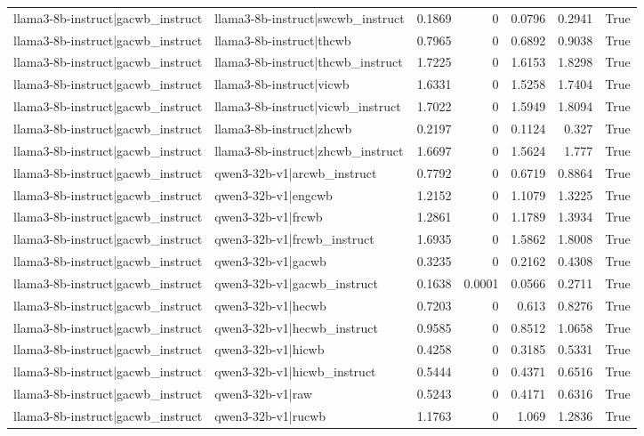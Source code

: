 \begin{table}
\begin{tabular}{l l r r r r l}
llama3-8b-instruct|gacwb_instruct & llama3-8b-instruct|swcwb_instruct & 0.1869 & 0 & 0.0796 & 0.2941 & True \\
llama3-8b-instruct|gacwb_instruct & llama3-8b-instruct|thcwb & 0.7965 & 0 & 0.6892 & 0.9038 & True \\
llama3-8b-instruct|gacwb_instruct & llama3-8b-instruct|thcwb_instruct & 1.7225 & 0 & 1.6153 & 1.8298 & True \\
llama3-8b-instruct|gacwb_instruct & llama3-8b-instruct|vicwb & 1.6331 & 0 & 1.5258 & 1.7404 & True \\
llama3-8b-instruct|gacwb_instruct & llama3-8b-instruct|vicwb_instruct & 1.7022 & 0 & 1.5949 & 1.8094 & True \\
llama3-8b-instruct|gacwb_instruct & llama3-8b-instruct|zhcwb & 0.2197 & 0 & 0.1124 & 0.327 & True \\
llama3-8b-instruct|gacwb_instruct & llama3-8b-instruct|zhcwb_instruct & 1.6697 & 0 & 1.5624 & 1.777 & True \\
llama3-8b-instruct|gacwb_instruct & qwen3-32b-v1|arcwb_instruct & 0.7792 & 0 & 0.6719 & 0.8864 & True \\
llama3-8b-instruct|gacwb_instruct & qwen3-32b-v1|engcwb & 1.2152 & 0 & 1.1079 & 1.3225 & True \\
llama3-8b-instruct|gacwb_instruct & qwen3-32b-v1|frcwb & 1.2861 & 0 & 1.1789 & 1.3934 & True \\
llama3-8b-instruct|gacwb_instruct & qwen3-32b-v1|frcwb_instruct & 1.6935 & 0 & 1.5862 & 1.8008 & True \\
llama3-8b-instruct|gacwb_instruct & qwen3-32b-v1|gacwb & 0.3235 & 0 & 0.2162 & 0.4308 & True \\
llama3-8b-instruct|gacwb_instruct & qwen3-32b-v1|gacwb_instruct & 0.1638 & 0.0001 & 0.0566 & 0.2711 & True \\
llama3-8b-instruct|gacwb_instruct & qwen3-32b-v1|hecwb & 0.7203 & 0 & 0.613 & 0.8276 & True \\
llama3-8b-instruct|gacwb_instruct & qwen3-32b-v1|hecwb_instruct & 0.9585 & 0 & 0.8512 & 1.0658 & True \\
llama3-8b-instruct|gacwb_instruct & qwen3-32b-v1|hicwb & 0.4258 & 0 & 0.3185 & 0.5331 & True \\
llama3-8b-instruct|gacwb_instruct & qwen3-32b-v1|hicwb_instruct & 0.5444 & 0 & 0.4371 & 0.6516 & True \\
llama3-8b-instruct|gacwb_instruct & qwen3-32b-v1|raw & 0.5243 & 0 & 0.4171 & 0.6316 & True \\
llama3-8b-instruct|gacwb_instruct & qwen3-32b-v1|rucwb & 1.1763 & 0 & 1.069 & 1.2836 & True \\

\end{tabular}
\end{table}
